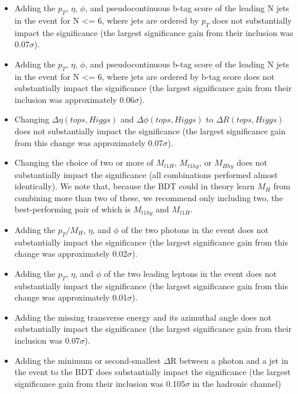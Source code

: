 \begin{itemize}
\item Adding the $p_{T}$, $\eta$, $\phi$, and pseudocontinuous b-tag score of the leading N jets in the event for N <= 6, where jets are ordered by $p_{T}$ does not substantially impact the significance (the largest significance gain from their inclusion was 0.07$\sigma$).

\item Adding the $p_{T}$, $\eta$, $\phi$, and pseudocontinuous b-tag score of the leading N jets in the event for N <= 6, where jets are ordered by b-tag score does not substantially impact the significance (the largest significance gain from their inclusion was approximately 0.06$\sigma$).

\item Changing $\Delta \eta (tops, Higgs)$ and $\Delta \phi (tops, Higgs)$ to $\Delta R (tops, Higgs)$ does not substantially impact the significance (the largest significance gain from this change was approximately 0.07$\sigma$).

\item Changing the choice of two or more of $M_{t1H}$, $M_{t1hy}$, or $M_{Hhy}$ does not substantially impact the significance (all combinations performed almost identically). We note that, because the BDT could in theory learn $M_{H}$ from combining more than two of these, we recommend only including two, the best-performing pair of which is $M_{t1hy}$ and $M_{t1H}$.

\item Adding the $p_{T}/M_{H}$, $\eta$, and $\phi$ of the two photons in the event does not substantially impact the significance (the largest significance gain from this change was approximately 0.02$\sigma$).

\item Adding the $p_{T}$, $\eta$, and $\phi$ of the two leading leptons in the event does not substantially impact the significance (the largest significance gain from this change was approximately 0.01$\sigma$).

\item Adding the missing transverse energy and its azimuthal angle does not substantially impact the significance  (the largest significance gain from their inclusion was 0.07$\sigma$).

\item Adding the minimum or second-smallest $\Delta$R between a photon and a jet in the event to the BDT does substantially impact the significance (the largest significance gain from their inclusion was 0.105$\sigma$ in the hadronic channel)
\end{itemize} 

